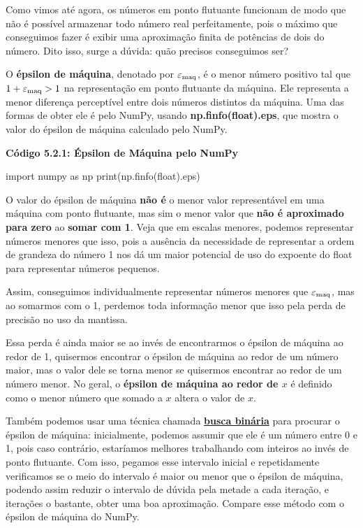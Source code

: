 \documentclass[11pt, a4paper]{article}
\begin{document}
Como vimos até agora, os números em ponto flutuante funcionam de modo que não é possível armazenar todo número real perfeitamente, pois o máximo que conseguimos fazer é exibir uma aproximação finita de potências de dois do número. Dito isso, surge a dúvida: quão precisos conseguimos ser?

O \textbf{épsilon de máquina}, denotado por \(\varepsilon_{\text{maq}}\), é o menor número positivo tal que \(1 + \varepsilon_{\text{maq}} > 1\) na representação em ponto flutuante da máquina. Ele representa a menor diferença perceptível entre dois números distintos da máquina. Uma das formas de obter ele é pelo NumPy, usando \textbf{np.finfo(float).eps}, que mostra o valor do épsilon de máquina calculado pelo NumPy.

\textbf{Código 5.2.1: Épsilon de Máquina pelo NumPy}

\begin{code}
import numpy as np
print(np.finfo(float).eps)
\end{code}

\void[-0.5]

O valor do épsilon de máquina \textbf{não é} o menor valor representável em uma máquina com ponto flutuante, mas sim o menor valor que \textbf{não é aproximado para zero} ao \textbf{somar com 1}. Veja que em escalas menores, podemos representar números menores que isso, pois a ausência da necessidade de representar a ordem de grandeza do número 1 nos dá um maior potencial de uso do expoente do float para representar números pequenos.

Assim, conseguimos individualmente representar números menores que \(\varepsilon_{\text{maq}}\), mas ao somarmos com o 1, perdemos toda informação menor que isso pela perda de precisão no uso da mantissa. 

Essa perda é ainda maior se ao invés de encontrarmos o épsilon de máquina ao redor de 1, quisermos encontrar o épsilon de máquina ao redor de um número maior, mas o valor dele se torna menor se quisermos encontrar ao redor de um número menor. No geral, o \textbf{épsilon de máquina ao redor de \(x\)} é definido como o menor número que somado a \(x\) altera o valor de \(x\).

Também podemos usar uma técnica chamada \textbf{\href{https://en.wikipedia.org/wiki/Binary_search}{busca binária}} para procurar o épsilon de máquina: inicialmente, podemos assumir que ele é um número entre 0 e 1, pois caso contrário, estaríamos melhores trabalhando com inteiros ao invés de ponto flutuante.  Com isso, pegamos esse intervalo inicial e repetidamente verificamos se o meio do intervalo é maior ou menor que o épsilon de máquina, podendo assim reduzir o intervalo de dúvida pela metade a cada iteração, e iterações o bastante, obter uma boa aproximação. Compare esse método com o épsilon de máquina do NumPy.
\end{document}

